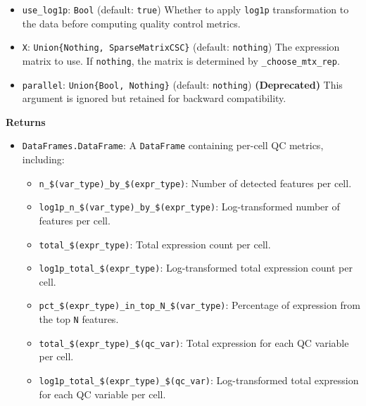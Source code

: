 \documentclass[oneside]{memoir}
\begin{document}
\begin{adjustwidth}{2em}{0pt}
\begin{itemize}
\item \texttt{use\_log1p}: \texttt{Bool} (default: \texttt{true})   Whether to apply \texttt{log1p} transformation to the data before computing quality control metrics.


\item \texttt{X}: \texttt{Union\{Nothing, SparseMatrixCSC\}} (default: \texttt{nothing})   The expression matrix to use. If \texttt{nothing}, the matrix is determined by \texttt{\_choose\_mtx\_rep}.


\item \texttt{parallel}: \texttt{Union\{Bool, Nothing\}} (default: \texttt{nothing})   \textbf{(Deprecated)} This argument is ignored but retained for backward compatibility.

\end{itemize}
\textbf{Returns}

\begin{itemize}
\item \texttt{DataFrames.DataFrame}:   A \texttt{DataFrame} containing per-cell QC metrics, including:

\begin{itemize}
\item \texttt{{\textquotedbl}n\_\$(var\_type)\_by\_\$(expr\_type){\textquotedbl}}: Number of detected features per cell.


\item \texttt{{\textquotedbl}log1p\_n\_\$(var\_type)\_by\_\$(expr\_type){\textquotedbl}}: Log-transformed number of features per cell.


\item \texttt{{\textquotedbl}total\_\$(expr\_type){\textquotedbl}}: Total expression count per cell.


\item \texttt{{\textquotedbl}log1p\_total\_\$(expr\_type){\textquotedbl}}: Log-transformed total expression count per cell.


\item \texttt{{\textquotedbl}pct\_\$(expr\_type)\_in\_top\_N\_\$(var\_type){\textquotedbl}}: Percentage of expression from the top \texttt{N} features.


\item \texttt{{\textquotedbl}total\_\$(expr\_type)\_\$(qc\_var){\textquotedbl}}: Total expression for each QC variable per cell.


\item \texttt{{\textquotedbl}log1p\_total\_\$(expr\_type)\_\$(qc\_var){\textquotedbl}}: Log-transformed total expression for each QC variable per cell.



\end{itemize}
\end{itemize}
\end{adjustwidth}
\end{document}
